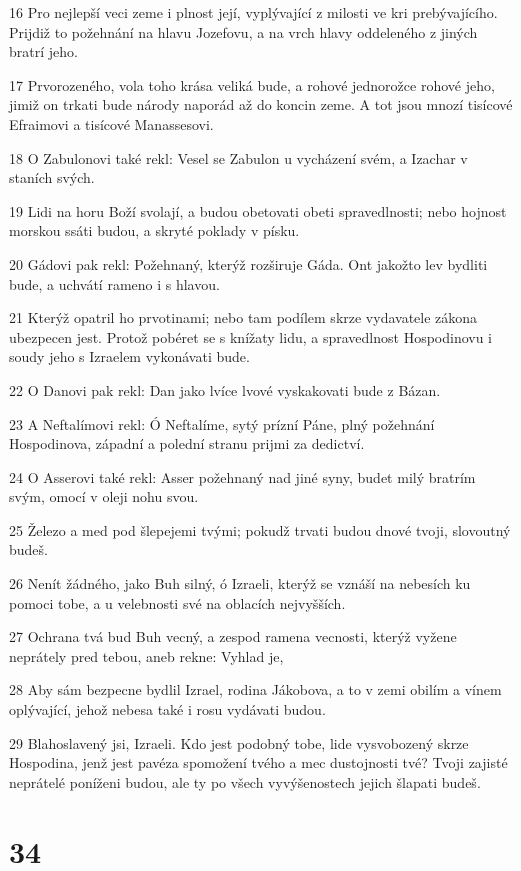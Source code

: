 \par 16 Pro nejlepší veci zeme i plnost její, vyplývající z milosti ve kri prebývajícího. Prijdiž to požehnání na hlavu Jozefovu, a na vrch hlavy oddeleného z jiných bratrí jeho.
\par 17 Prvorozeného, vola toho krása veliká bude, a rohové jednorožce rohové jeho, jimiž on trkati bude národy naporád až do koncin zeme. A tot jsou mnozí tisícové Efraimovi a tisícové Manassesovi.
\par 18 O Zabulonovi také rekl: Vesel se Zabulon u vycházení svém, a Izachar v staních svých.
\par 19 Lidi na horu Boží svolají, a budou obetovati obeti spravedlnosti; nebo hojnost morskou ssáti budou, a skryté poklady v písku.
\par 20 Gádovi pak rekl: Požehnaný, kterýž rozširuje Gáda. Ont jakožto lev bydliti bude, a uchvátí rameno i s hlavou.
\par 21 Kterýž opatril ho prvotinami; nebo tam podílem skrze vydavatele zákona ubezpecen jest. Protož pobéret se s knížaty lidu, a spravedlnost Hospodinovu i soudy jeho s Izraelem vykonávati bude.
\par 22 O Danovi pak rekl: Dan jako lvíce lvové vyskakovati bude z Bázan.
\par 23 A Neftalímovi rekl: Ó Neftalíme, sytý prízní Páne, plný požehnání Hospodinova, západní a polední stranu prijmi za dedictví.
\par 24 O Asserovi také rekl: Asser požehnaný nad jiné syny, budet milý bratrím svým, omocí v oleji nohu svou.
\par 25 Železo a med pod šlepejemi tvými; pokudž trvati budou dnové tvoji, slovoutný budeš.
\par 26 Nenít žádného, jako Buh silný, ó Izraeli, kterýž se vznáší na nebesích ku pomoci tobe, a u velebnosti své na oblacích nejvyšších.
\par 27 Ochrana tvá bud Buh vecný, a zespod ramena vecnosti, kterýž vyžene neprátely pred tebou, aneb rekne: Vyhlad je,
\par 28 Aby sám bezpecne bydlil Izrael, rodina Jákobova, a to v zemi obilím a vínem oplývající, jehož nebesa také i rosu vydávati budou.
\par 29 Blahoslavený jsi, Izraeli. Kdo jest podobný tobe, lide vysvobozený skrze Hospodina, jenž jest pavéza spomožení tvého a mec dustojnosti tvé? Tvoji zajisté neprátelé poníženi budou, ale ty po všech vyvýšenostech jejich šlapati budeš.

\chapter{34}


